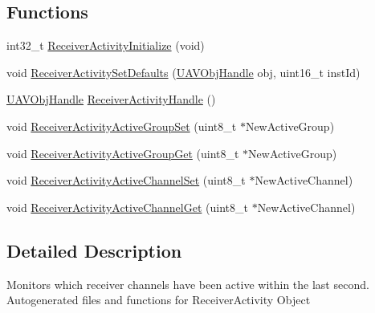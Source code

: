 \subsection*{\-Functions}
\begin{DoxyCompactItemize}
\item 
int32\-\_\-t \hyperlink{group___receiver_activity_gab54121f527debb61f44964936e23e2a5}{\-Receiver\-Activity\-Initialize} (void)
\item 
void \hyperlink{group___receiver_activity_gaffc062ee300f77bdc77e71097a67409f}{\-Receiver\-Activity\-Set\-Defaults} (\hyperlink{targets_2_u_a_v_objects_2inc_2uavobjectmanager_8h_a279053e22be53ce9f895043aaeb91e3b}{\-U\-A\-V\-Obj\-Handle} obj, uint16\-\_\-t inst\-Id)
\item 
\hyperlink{targets_2_u_a_v_objects_2inc_2uavobjectmanager_8h_a279053e22be53ce9f895043aaeb91e3b}{\-U\-A\-V\-Obj\-Handle} \hyperlink{group___receiver_activity_gab9dcb92c8cfa9eb2db38052b115140c1}{\-Receiver\-Activity\-Handle} ()
\item 
void \hyperlink{group___receiver_activity_ga077092591c7d0edb65e11c920975b269}{\-Receiver\-Activity\-Active\-Group\-Set} (uint8\-\_\-t $\ast$\-New\-Active\-Group)
\item 
void \hyperlink{group___receiver_activity_ga61ba0e9357c951ad8382ea95a7b0aea7}{\-Receiver\-Activity\-Active\-Group\-Get} (uint8\-\_\-t $\ast$\-New\-Active\-Group)
\item 
void \hyperlink{group___receiver_activity_ga4e3a0d8cb2c48e38c1aae28f1ec7302e}{\-Receiver\-Activity\-Active\-Channel\-Set} (uint8\-\_\-t $\ast$\-New\-Active\-Channel)
\item 
void \hyperlink{group___receiver_activity_ga8523ade5f015720b7c2853d749aeff66}{\-Receiver\-Activity\-Active\-Channel\-Get} (uint8\-\_\-t $\ast$\-New\-Active\-Channel)
\end{DoxyCompactItemize}


\subsection{\-Detailed \-Description}
\-Monitors which receiver channels have been active within the last second. \-Autogenerated files and functions for \-Receiver\-Activity \-Object 

